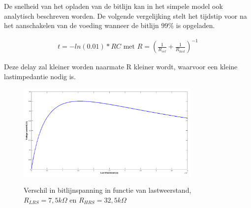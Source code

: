 De snelheid van het opladen van de bitlijn kan in het simpele model ook analytisch beschreven worden. De volgende vergelijking stelt het tijdstip voor na het aanschakelen van de voeding wanneer de bitlijn $99\%$ is opgeladen.

\begin{align}
t = -ln(0.01)*RC \text{ met } R = (\frac{1}{R_{cel}} + \frac{1}{R_{last}})^{-1}
\end{align}

Deze delay zal kleiner worden naarmate R kleiner wordt, waarvoor een kleine lastimpedantie nodig is.

\begin{figure}[!ht]
\centering
 \includegraphics[width=0.80\textwidth] {../fig/hfdst-last-rpiek.png} \label{fig:rpiek}
\caption{Verschil in bitlijnspanning in functie van lastweerstand, $R_{LRS}=7,5 k \Omega$ en $R_{HRS}= 32,5 k \Omega$}
\end{figure}




